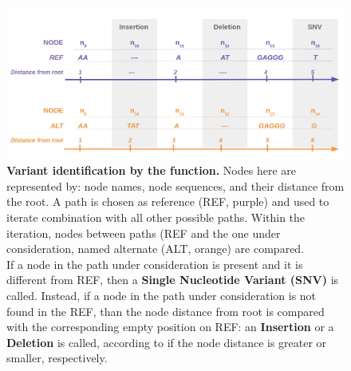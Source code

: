 
\begin{figure}[H]
\centering
\includegraphics[width=1.00 \textwidth]{fig/path_ref.png}
\decoRule
\caption{\textbf{Variant identification by the \bbc function.} Nodes here are represented by: node names, node sequences, and their distance from the root. A path is chosen as reference (REF, purple) and used to iterate combination with all other possible paths. Within the iteration, nodes between paths (REF and the one under consideration, named alternate (ALT, orange) are compared. \\If a node in the path under consideration is present and it is different from REF, then a \textbf{Single Nucleotide Variant (SNV)} is called. Instead, if a node in the path under consideration is not found in the REF, than the node distance from root is compared with the corresponding empty position on REF: an \textbf{Insertion} or a \textbf{Deletion} is called, according to if the node distance is greater or smaller, respectively.}
\label{fig:path_ref.png}
\end{figure}






